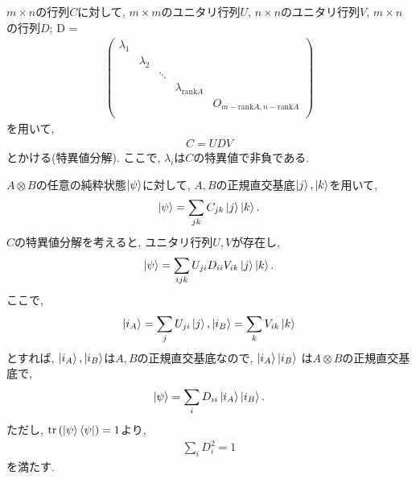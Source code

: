 \begin{ex}
    \label{ex2.76}
    $m\times n$の行列$C$に対して, $m \times m$のユニタリ行列$U$, $n\times n$のユニタリ行列$V$, $m \times n$の行列$D$;
    D =
    \begin{align*}
        \begin{pmatrix}
            \lambda_1 &           &        &                          &                                        \\
                      & \lambda_2 &        &                          &                                        \\
                      &           & \ddots &                          &                                        \\
                      &           &        & \lambda_{\mathrm{rank}A} &                                        \\
                      &           &        &                          & O_{m-\mathrm{rank}A, n-\mathrm{rank}A} \\
        \end{pmatrix}
    \end{align*}
    を用いて,
    \begin{align*}
        C = UDV
    \end{align*}
    とかける(特異値分解). ここで, $\lambda_i$は$C$の特異値で非負である.
    \par
    $A \otimes B$の任意の純粋状態$\ket{\psi}$に対して,
    $A,B$の正規直交基底$\ket{j}, \ket{k}$を用いて,
    \begin{align*}
        \ket{ \psi} = \sum_{jk} C_{jk} \ket{j} \ket{k}.
    \end{align*}
    $C$の特異値分解を考えると, ユニタリ行列$U,V$が存在し,
    \begin{align*}
        \ket{ \psi} = \sum_{ijk} U_{ji} D_{ii} V_{ik}\ket{j} \ket{k}.
    \end{align*}
    ここで,
    \begin{align*}
        \ket{i_A} = \sum_j U_{ji} \ket{j}, \ket{i_B} = \sum_k V_{ik} \ket{k}
    \end{align*}
    とすれば, $\ket{i_A}, \ket{i_B}$は$A,B$の正規直交基底なので, $\ket{i_A}\ket{i_B}$
    は$A \otimes B$の正規直交基底で,
    \begin{align*}
        \ket{ \psi} = \sum_{i} D_{ii} \ket{i_A}\ket{i_B}.
    \end{align*}
    ただし, $\mathrm{tr}\left( \ket{\psi} \bra{\psi}\right) = 1$より,
    \begin{align*}
        \sum_{i} D_i^2 = 1
    \end{align*}
    を満たす.
\end{ex}

